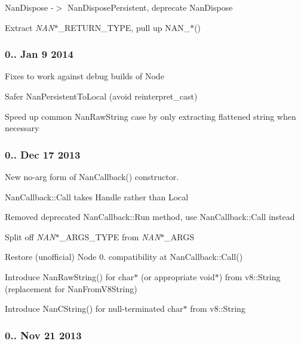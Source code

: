 \begin{DoxyItemize}
\item Nan\+Dispose -\/$>$ Nan\+Dispose\+Persistent, deprecate Nan\+Dispose
\item Extract {\itshape N\+AN}$\ast$\+\_\+\+R\+E\+T\+U\+R\+N\+\_\+\+T\+Y\+PE, pull up N\+A\+N\+\_\+$\ast$()
\end{DoxyItemize}

\subsubsection*{0.. Jan 9 2014}


\begin{DoxyItemize}
\item Fixes to work against debug builds of Node
\item Safer Nan\+Persistent\+To\+Local (avoid reinterpret\+\_\+cast)
\item Speed up common Nan\+Raw\+String case by only extracting flattened string when necessary
\end{DoxyItemize}

\subsubsection*{0.. Dec 17 2013}


\begin{DoxyItemize}
\item New no-\/arg form of Nan\+Callback() constructor.
\item Nan\+Callback\+::\+Call takes Handle rather than Local
\item Removed deprecated Nan\+Callback\+::\+Run method, use Nan\+Callback\+::\+Call instead
\item Split off {\itshape N\+AN}$\ast$\+\_\+\+A\+R\+G\+S\+\_\+\+T\+Y\+PE from {\itshape N\+AN}$\ast$\+\_\+\+A\+R\+GS
\item Restore (unofficial) Node 0. compatibility at Nan\+Callback\+::\+Call()
\item Introduce Nan\+Raw\+String() for char$\ast$ (or appropriate void$\ast$) from v8\+::\+String (replacement for Nan\+From\+V8\+String)
\item Introduce Nan\+C\+String() for null-\/terminated char$\ast$ from v8\+::\+String
\end{DoxyItemize}

\subsubsection*{0.. Nov 21 2013}


